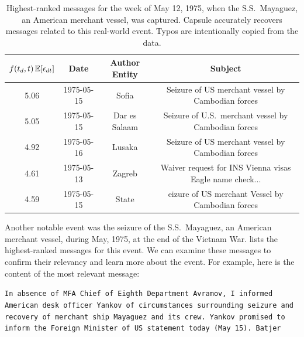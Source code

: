\begin{table}[ht]
\small
\centering
\begin{tabular}{cccc}
\toprule
$f(t_d, t)\, \mathbb{E}[\epsilon_{dt}]$ & \textbf{Date} & \textbf{Author Entity} & \textbf{Subject} \\
\midrule
5.06 & 1975-05-15 & Sofia & Seizure of US merchant vessel by Cambodian forces \\
5.05 & 1975-05-15 & Dar es Salaam & Seizure of U.S.~merchant vessel by Cambodian forces \\
4.92 & 1975-05-16 & Lusaka & Seizure of US merchant vessel by Cambodian forces \\
4.61 & 1975-05-13 & Zagreb & Waiver request for INS Vienna visas Eagle name check... \\
4.59 & 1975-05-15 & State & eizure of US merchant Vessel by Cambodian forces \\
\bottomrule
\end{tabular}
\caption{Highest-ranked messages for the week of May 12, 1975, when the
  S.S.~Mayaguez, an American merchant vessel, was captured. Capsule
  accurately recovers messages related to this real-world event. Typos
  are intentionally copied from the data.}
\label{tab:mayaguez}
\end{table}

Another notable event was the seizure of the S.S.~Mayaguez, an
American merchant vessel, during May, 1975, at the end of the Vietnam
War.  lists the highest-ranked messages for this
event. We can examine these messages to confirm their relevancy and
learn more about the event. For example, here is the content of the
most relevant message:
\begin{shaded*} \tt{In absence of MFA Chief of Eighth Department Avramov, I
informed American desk officer Yankov of circumstances surrounding seizure
and recovery of merchant ship Mayaguez and its crew.  Yankov promised to
inform the Foreign Minister of US statement today  (May 15).
Batjer
}
\end{shaded*}


